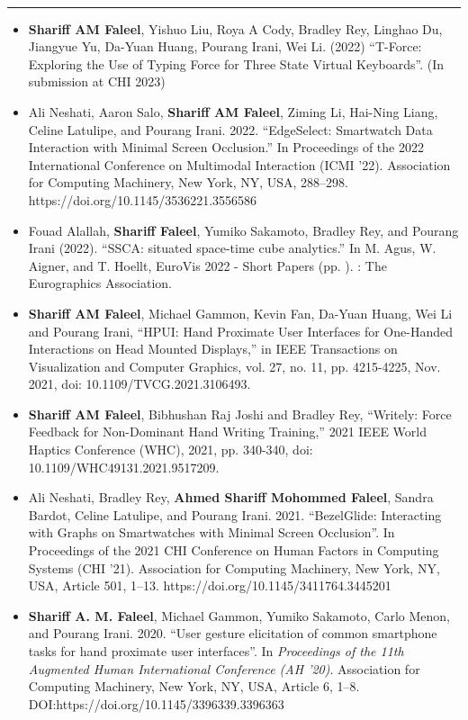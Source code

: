 \documentclass[a4paper,11pt]{article}
\begin{document}
\vspace{10pt}
\noindent
\textbf{\large{}}
\vspace{-8pt}\noindent\\\rule{0.75\textwidth}{0.4pt}
\vspace{-8pt}
\begin{itemize}
  \item[]\textbf{Shariff AM Faleel}, Yishuo Liu, Roya A Cody, Bradley Rey, Linghao Du, Jiangyue Yu, Da-Yuan Huang, Pourang Irani, Wei Li. (2022) ``T-Force: Exploring the Use of Typing Force for Three State Virtual Keyboards''. (In submission at CHI 2023)
  \item[]Ali Neshati, Aaron Salo, \textbf{Shariff AM Faleel}, Ziming Li, Hai-Ning Liang, Celine Latulipe, and Pourang Irani. 2022. ``EdgeSelect: Smartwatch Data Interaction with Minimal Screen Occlusion.'' In Proceedings of the 2022 International Conference on Multimodal Interaction (ICMI '22). Association for Computing Machinery, New York, NY, USA, 288–298. \\https://doi.org/10.1145/3536221.3556586
  \item[]Fouad Alallah, \textbf{Shariff Faleel}, Yumiko Sakamoto, Bradley Rey, and Pourang Irani (2022). ``SSCA: situated space-time cube analytics.'' In M. Agus, W. Aigner, and T. Hoellt, EuroVis 2022 - Short Papers (pp. ). : The Eurographics Association.
  \item[]\textbf{Shariff AM Faleel}, Michael Gammon, Kevin Fan, Da-Yuan Huang, Wei Li and Pourang Irani, ``HPUI: Hand Proximate User Interfaces for One-Handed Interactions on Head Mounted Displays,'' in IEEE Transactions on Visualization and Computer Graphics, vol. 27, no. 11, pp. 4215-4225, Nov. 2021, doi: 10.1109/TVCG.2021.3106493.
  \item[]\textbf{Shariff AM Faleel}, Bibhushan Raj Joshi and Bradley Rey, ``Writely: Force Feedback for Non-Dominant Hand Writing Training,'' 2021 IEEE World Haptics Conference (WHC), 2021, pp. 340-340, doi: 10.1109/WHC49131.2021.9517209.
  \item[]Ali Neshati, Bradley Rey, \textbf{Ahmed Shariff Mohommed Faleel}, Sandra Bardot, Celine Latulipe, and Pourang Irani. 2021. ``BezelGlide: Interacting with Graphs on Smartwatches with Minimal Screen Occlusion''. In Proceedings of the 2021 CHI Conference on Human Factors in Computing Systems (CHI '21). Association for Computing Machinery, New York, NY, USA, Article 501, 1–13. https://doi.org/10.1145/3411764.3445201
  \item[]\textbf{Shariff A. M. Faleel}, Michael Gammon, Yumiko Sakamoto, Carlo Menon, and Pourang Irani. 2020. ``User gesture elicitation of common smartphone tasks for hand proximate user interfaces''. In \textit{Proceedings of the 11th Augmented Human International Conference (AH '20)}. Association for Computing Machinery, New York, NY, USA, Article 6, 1–8. \\DOI:https://doi.org/10.1145/3396339.3396363

\end{itemize}
\end{document}
